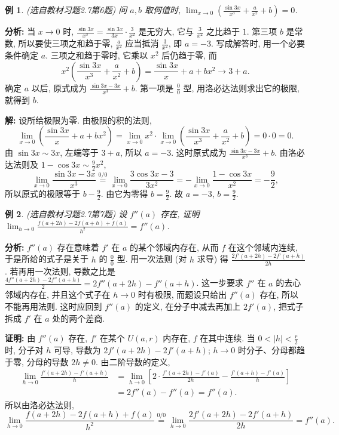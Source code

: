 \documentclass[UTF8,openany]{ctexbook}
\theoremstyle{chinesetextbook}
\newtheorem{example}{例}[section]
\newenvironment{cnproof}{\par\indent\textbf{证明:} \ignorespaces}{\par}
\newenvironment{cnsolution}{\par\indent\textbf{解:} \ignorespaces}{\par}
\begin{document}
\begin{example}\label{ex:c2-h7-6}
\textnormal{(选自教材习题2.7第6题)} 问 $a,b$ 取何值时, $\displaystyle\lim_{x\to0}\left(\frac{\sin3x}{x^3}+\frac a{x^2}+b\right)=0$.
\end{example}
\par\indent\textbf{分析:} 当 $x\to0$ 时, $\displaystyle\frac{\sin3x}{x^3}=\frac{\sin3x}{3x}\cdot\frac3{x^2}$ 是无穷大, 它与 $\displaystyle\frac3{x^2}$ 之比趋于 $1$. 第三项 $b$ 是常数, 所以要使三项之和趋于零, $\displaystyle\frac a{x^2}$ 应当抵消 $\displaystyle\frac3{x^2}$, 即 $a=-3$. 写成解答时, 用一个必要条件确定 $a$. 三项之和趋于零时, 它乘以 $x^2$ 后仍趋于零, 而
\[
x^2\left(\frac{\sin3x}{x^3}+\frac a{x^2}+b\right)=\frac{\sin3x}x+a+bx^2\to3+a.
\]
确定 $a$ 以后, 原式成为 $\displaystyle\frac{\sin3x-3x}{x^3}+b$. 第一项是 $\displaystyle\frac00$ 型, 用洛必达法则求出它的极限, 就得到 $b$.
\begin{cnsolution}
设所给极限为零. 由极限的积的法则,
\[
\lim_{x\to0}\left(\frac{\sin3x}x+a+bx^2\right)=\lim_{x\to0}x^2\cdot\lim_{x\to0}\left(\frac{\sin3x}{x^3}+\frac a{x^2}+b\right)=0\cdot0=0.
\]
由 $\sin3x\sim3x$, 左端等于 $3+a$, 所以 $a=-3$. 这时原式成为 $\displaystyle\frac{\sin3x-3x}{x^3}+b$. 由洛必达法则及 $\displaystyle1-\cos3x\sim\frac92x^2$,
\[
\lim_{x\to0}\frac{\sin3x-3x}{x^3}\overset{0/0}{=}\lim_{x\to0}\frac{3\cos3x-3}{3x^2}=-\lim_{x\to0}\frac{1-\cos3x}{x^2}=-\frac92,
\]
所以原式的极限等于 $\displaystyle b-\frac92$. 由它为零得 $\displaystyle b=\frac92$. 故 $a=-3$, $\displaystyle b=\frac92$.
\end{cnsolution}
\begin{example}\label{ex:c2-h7-7}
\textnormal{(选自教材习题2.7第7题)} 设 $f''(a)$ 存在, 证明 $\displaystyle\lim_{h\to0}\frac{f(a+2h)-2f(a+h)+f(a)}{h^2}=f''(a)$.
\end{example}
\par\indent\textbf{分析:} $f''(a)$ 存在意味着 $f'$ 在 $a$ 的某个邻域内存在, 从而 $f$ 在这个邻域内连续, 于是所给的式子是关于 $h$ 的 $\displaystyle\frac00$ 型. 用一次法则 (对 $h$ 求导) 得 $\displaystyle\frac{2f'(a+2h)-2f'(a+h)}{2h}$. 若再用一次法则, 导数之比是 $\displaystyle\frac{4f''(a+2h)-2f''(a+h)}2=2f''(a+2h)-f''(a+h)$. 这一步要求 $f''$ 在 $a$ 的去心邻域内存在, 并且这个式子在 $h\to0$ 时有极限, 而题设只给出 $f''(a)$ 存在, 所以不能再用法则. 这时应回到 $f''(a)$ 的定义, 在分子中减去再加上 $2f'(a)$, 把式子拆成 $f'$ 在 $a$ 处的两个差商.
\begin{cnproof}
由 $f''(a)$ 存在, $f'$ 在某个 $U(a,r)$ 内存在, $f$ 在其中连续. 当 $\displaystyle0<|h|<\frac r2$ 时, 分子对 $h$ 可导, 导数为 $2f'(a+2h)-2f'(a+h)$; $h\to0$ 时分子、分母都趋于零, 分母的导数 $2h\ne0$. 由二阶导数的定义,
\[
\begin{aligned}
\lim_{h\to0}\frac{f'(a+2h)-f'(a+h)}h&=\lim_{h\to0}\left[2\cdot\frac{f'(a+2h)-f'(a)}{2h}-\frac{f'(a+h)-f'(a)}h\right]\\
&=2f''(a)-f''(a)=f''(a).
\end{aligned}
\]
所以由洛必达法则,
\[
\lim_{h\to0}\frac{f(a+2h)-2f(a+h)+f(a)}{h^2}\overset{0/0}{=}\lim_{h\to0}\frac{2f'(a+2h)-2f'(a+h)}{2h}=f''(a).
\]
\end{cnproof}
\end{document}
